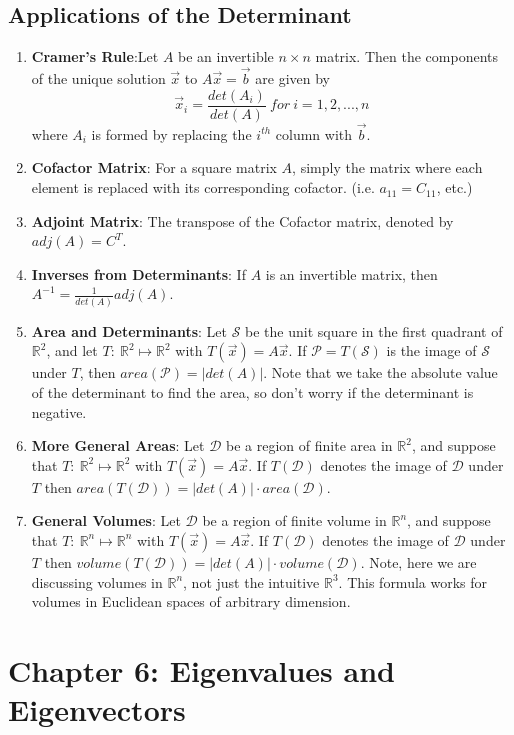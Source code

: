 \documentclass[10pt]{article}
\begin{document}
\subsection{Applications of the Determinant}
\begin{enumerate}
\item \textbf{Cramer's Rule}:Let $A$ be an invertible $n \times n$ matrix. Then the components of the unique solution $\vec{x}$ to $A\vec{x} = \vec{b}$ are given by 
$$\vec{x}_i = \frac{det(A_i)}{det(A)}\ for\ i = 1,2,...,n$$
where $A_i$ is formed by replacing the $i^{th}$ column with $\vec{b}$.
\item \textbf{Cofactor Matrix}: For a square matrix $A$, simply the matrix where each element is replaced with its corresponding cofactor. (i.e. $a_{11} = C_{11}$, etc.) 
\item \textbf{Adjoint Matrix}: The transpose of the Cofactor matrix, denoted by $adj(A) = C^T$.
\item \textbf{Inverses from Determinants}: If $A$ is an invertible matrix, then $A^{-1} = \frac{1}{det(A)}adj(A)$.
\item \textbf{Area and Determinants}: Let $\mathcal{S}$ be the unit square in the first quadrant of $\mathbb{R}^2$, and let $T:\ \mathbb{R}^2 \mapsto \mathbb{R}^2$ with $T(\vec{x}) = A\vec{x}$. If $\mathcal{P} = T(\mathcal{S})$ is the image of $\mathcal{S}$ under $T$, then $area(\mathcal{P}) = |det(A)|$. Note that we take the absolute value of the determinant to find the area, so don't worry if the determinant is negative.
\item \textbf{More General Areas}: Let $\mathcal{D}$ be a region of finite area in $\mathbb{R}^2$, and suppose that $T:\ \mathbb{R}^2 \mapsto \mathbb{R}^2$ with $T(\vec{x}) = A\vec{x}$. If $T(\mathcal{D})$ denotes the image of $\mathcal{D}$ under $T$ then $area(T(\mathcal{D})) = |det(A)| \cdot area(\mathcal{D})$.
\item \textbf{General Volumes}: Let $\mathcal{D}$ be a region of finite volume in $\mathbb{R}^n$, and suppose that $T:\ \mathbb{R}^n \mapsto \mathbb{R}^n$ with $T(\vec{x}) = A\vec{x}$. If $T(\mathcal{D})$ denotes the image of $\mathcal{D}$ under $T$ then $volume(T(\mathcal{D})) = |det(A)| \cdot volume(\mathcal{D})$. Note, here we are discussing volumes in $\mathbb{R}^n$, not just the intuitive $\mathbb{R}^3$. This formula works for volumes in Euclidean spaces of arbitrary dimension.
\end{enumerate}
\section{Chapter 6: Eigenvalues and Eigenvectors}
\end{document}
